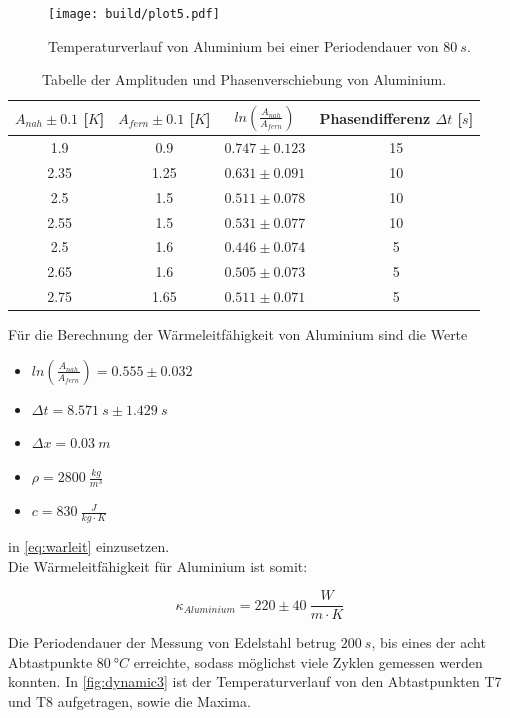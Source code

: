 \begin{figure}[htbp]
    \centering
    \texttt{[image: build/plot5.pdf]}
    \caption{Temperaturverlauf von Aluminium bei einer Periodendauer von $80\ s$.}
    \label{fig:dynamic2}
\end{figure}

\begin{table}
    \centering
    \caption{Tabelle der Amplituden und Phasenverschiebung von Aluminium.}
    \label{tab:ampl2}
    \begin{tabular}{c|c|c|c}
        \toprule
        $A_{nah}\pm 0.1$ [$K$] & $A_{fern}\pm 0.1$ [$K$] & $ln(\frac{A_{nah}}{A_{fern}})$ & Phasendifferenz $\Delta t$ [$s$]\\
        \midrule
        1.9 & 0.9 & $0.747\pm 0.123$ & 15\\
        2.35 & 1.25 & $0.631\pm 0.091$ & 10\\
        2.5 & 1.5 & $0.511\pm 0.078$ & 10\\
        2.55 & 1.5 & $0.531\pm 0.077$ & 10\\
        2.5 & 1.6 & $0.446\pm 0.074$ & 5\\
        2.65 & 1.6 & $0.505\pm 0.073$ & 5\\
        2.75 & 1.65 & $0.511\pm 0.071$ & 5\\
        \bottomrule
    \end{tabular}
\end{table}
\newpage
Für die Berechnung der Wärmeleitfähigkeit von Aluminium sind die Werte

\begin{itemize}
    \centering
    \item[] $ln(\frac{A_{nah}}{A_{fern}}) = 0.555\pm 0.032$
    \item[] $\Delta t = 8.571\ s\pm 1.429\ s$
    \item[] $\Delta x = 0.03\ m$
    \item[] $\rho = 2800\ \frac{kg}{m^3}$
    \item[] $c = 830\ \frac{J}{kg\cdot K}$
\end{itemize}

in \autoref{eq:warleit} einzusetzen.\\
Die Wärmeleitfähigkeit für Aluminium ist somit:
 
\begin{equation}
    \kappa_{Aluminium} = 220\pm 40\ \frac{W}{m\cdot K}
\end{equation}

Die Periodendauer der Messung von Edelstahl betrug $200\ s$, bis eines der  acht Abtastpunkte $80\ °C$ erreichte, sodass möglichst viele Zyklen gemessen werden konnten.
In \autoref{fig:dynamic3} ist der Temperaturverlauf von den Abtastpunkten T7 und T8 aufgetragen, sowie die Maxima.

